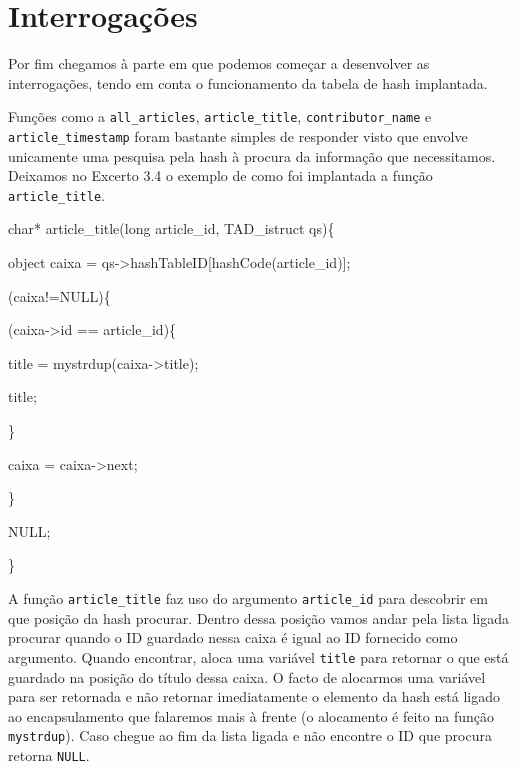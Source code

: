 \documentclass[a4paper,12pt]{report}
\newcommand\tab[1][1cm]{\hspace*{#1}}
\begin{document}
\section{Interrogações}

Por fim chegamos à parte em que podemos começar a desenvolver as interrogações, tendo em conta o funcionamento da tabela de hash implantada.

Funções como a {\tt all\_articles}, {\tt article\_title}, {\tt contributor\_name} e \\ {\tt article\_timestamp} foram bastante simples de responder visto que envolve unicamente uma pesquisa pela hash à procura da informação que necessitamos. Deixamos no Excerto 3.4 o exemplo de como foi implantada a função {\tt article\_title}.

\begin{tcolorbox}[width=\textwidth,colback={darkgray},title={\sf Excerto 3.4: {\tt article\_title}.},outer arc=2mm,colupper=white]{\footnotesize\tt
		
		{\color{newpink}char*} {\color{lightblue}article\_title}({\color{newpink}long} article\_id, TAD\_istruct qs)\{
		
			\tab object caixa {\color{newpink}=} qs->{\color{deadred}hashTableID}[{\color{lightblue}hashCode}(article\_id)];
			
			\tab {\color{newpink}while}(caixa{\color{newpink}!=}{\color{deadorange}NULL})\{
			
				\tab \tab {\color{newpink}if}(caixa->{\color{deadred}id} {\color{newpink}==} article\_id)\{
			
			    \tab \tab \tab {\color{newpink}char*} title = {\color{lightblue}mystrdup}(caixa->{\color{deadred}title});
			            
			    \tab \tab \tab {\color{newpink}return} title;
			    
			    \tab \tab \}
			    
				\tab \tab caixa {\color{newpink}=} caixa->{\color{deadred}next};
			
			\tab \}
			
			\tab {\color{newpink}return} {\color{deadorange}NULL};
		
		\} 
	}
\end{tcolorbox} 

A função {\tt article\_title} faz uso do argumento {\tt article\_id} para descobrir em que posição da hash procurar. Dentro dessa posição vamos andar pela lista ligada procurar quando o ID guardado nessa caixa é igual ao ID fornecido como argumento. Quando encontrar, aloca uma variável {\tt title} para retornar o que está guardado na posição do título dessa caixa. O facto de alocarmos uma variável para ser retornada e não retornar imediatamente o elemento da hash está ligado ao encapsulamento que falaremos mais à frente (o alocamento é feito na função {\tt mystrdup}). Caso chegue ao fim da lista ligada e não encontre o ID que procura retorna {\tt NULL}.
\end{document}
